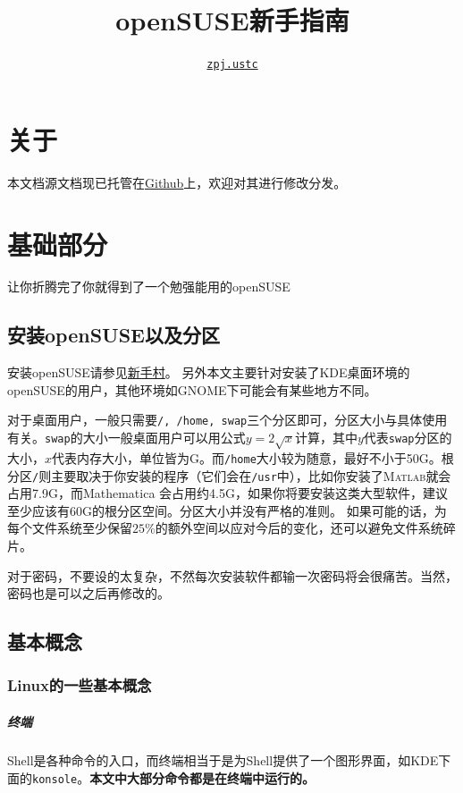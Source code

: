 \documentclass[11pt,openany]{book}
\newcommand{\command}[1]{\texttt{\textcolor{codec}{#1}}}
\newcommand{\soft}[1]{\texttt{\textcolor{dgreen}{#1}}}
\newcommand{\emp}[1]{\textbf{#1}}
\begin{document}
\title{openSUSE新手指南}
\author{\href{mailto:zpj.ustc@gmail.com}{\texttt{zpj.ustc}}}
\maketitle
\chapter*{关于}


本文档源文档现已托管在\href{https://github.com/zpj-ustc/openSUSE-novice-guide}{Github}上，欢迎对其进行修改分发。
\newpage
\tableofcontents
\newpage


\chapter{基础部分}
让你折腾完了你就得到了一个勉强能用的openSUSE
\section{安装openSUSE以及分区}
安装openSUSE请参见\href{https://zh.opensuse.org/%E6%96%B0%E6%89%8B%E6%9D%91}{新手村}。
另外本文主要针对安装了KDE桌面环境的openSUSE的用户，其他环境如GNOME下可能会有某些地方不同。

对于桌面用户，一般只需要\command{/, /home, swap}三个分区即可，分区大小与具体使用有关。\command{swap}的大小一般桌面用户可以用公式$y=2\sqrt{x}$计算，其中$y$代表\command{swap}分区的大小，$x$代表内存大小，单位皆为G。而\command{/home}大小较为随意，最好不小于50G。根分区\command{/}则主要取决于你安装的程序（它们会在\command{/usr}中），比如你安装了\textsc{Matlab}就会占用7.9G，而Mathematica 会占用约4.5G，如果你将要安装这类大型软件，建议至少应该有60G的根分区空间。分区大小并没有严格的准则。
如果可能的话，为每个文件系统至少保留$25\%$的额外空间以应对今后的变化，还可以避免文件系统碎片。

对于密码，不要设的太复杂，不然每次安装软件都输一次密码将会很痛苦。当然，密码也是可以之后再修改的。
\section{基本概念}
\subsection{Linux的一些基本概念}
\paragraph{终端} Shell是各种命令的入口，而终端相当于是为Shell提供了一个图形界面，如KDE下面的\soft{konsole}。\emp{本文中大部分命令都是在终端中运行的。}
\end{document}
